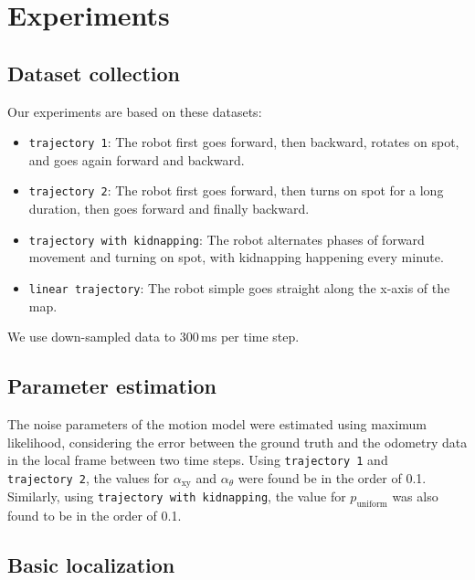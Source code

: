 \documentclass[letterpaper, 10pt, conference]{ieeeconf}
\begin{document}
\section{Experiments}

\subsection{Dataset collection}

Our experiments are based on these datasets:
\begin{itemize}
\item \texttt{trajectory~1}: The robot first goes forward, then backward, rotates on spot, and goes again forward and backward.
\item \texttt{trajectory~2}: The robot first goes forward, then turns on spot for a long duration, then goes forward and finally backward.
\item \texttt{trajectory with kidnapping}: The robot alternates phases of forward movement and turning on spot, with kidnapping happening every minute.
\item \texttt{linear trajectory}: The robot simple goes straight along the x-axis of the map.
\end{itemize}
We use down-sampled data to 300\,ms per time step.

\subsection{Parameter estimation}
\label{sec:mle}

The noise parameters of the motion model were estimated using maximum likelihood, considering the error between the ground truth and the odometry data in the local frame between two time steps.
Using \texttt{trajectory~1} and \texttt{trajectory~2}, the values for  $\alpha_\mathrm{xy}$ and $\alpha_\theta$ were found be in the order of 0.1.
Similarly, using \texttt{trajectory with kidnapping}, the value for $p_\mathrm{uniform}$ was also found to be in the order of 0.1.

\subsection{Basic localization}
\end{document}
